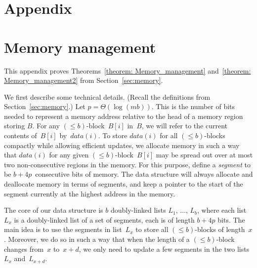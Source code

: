 \documentclass{llncs}
\begin{document}
\section*{Appendix}

\section{Memory management}\label{sec2:memory}\label{sec:proof1}

This appendix proves Theorems~\ref{theorem: Memory_management}
and~\ref{theorem: Memory_management2}
from Section~\ref{sec:memory}.

\medskip

We first describe some technical details.
(Recall the definitions from Section~\ref{sec:memory}.)
Let $p = \Theta(\log (mb))$.
This is the number of bits needed to represent a memory address
relative to the head of a memory region storing $B$.
For any $(\leq b)$-block~$B[i]$ in~$B$, we will refer to the current contents
of~$B[i]$ by~$data(i)$.
To store $data(i)$ for all $(\leq b)$-blocks compactly while allowing efficient
updates, we allocate memory in such a way that $data(i)$ for any given
$(\leq b)$-block~$B[i]$ may be spread out over at most two non-consecutive regions in the
memory.
For this purpose, define a \emph{segment} to be $b + 4p$~consecutive bits
of memory.
The data structure will always allocate and deallocate memory in terms of
segments, and keep a pointer to the start of the segment currently at the
highest address in the memory.

The core of our data structure is $b$ doubly-linked lists
$L_{1},\, \dots,\, L_{b}$, where
each list $L_x$ is a doubly-linked list of a set of segments,
each is of length $b+4p$ bits.
The main idea is to use the segments in list~$L_{x}$ to store all
$(\leq b)$-blocks of length~$x$.
Moreover, we do so in such a way that when the length of a
$(\leq b)$-block changes from~$x$ to~$x+d$, we only need to update a
few segments in the two lists~$L_{x}$ and~$L_{x+d}$.
\end{document}
